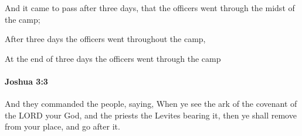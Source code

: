 			\begin{versebox}
					\item[BHS] 
					\item[ASV] And it came to pass after three days, that the officers went through the midst of the camp;
					\item[NIV] After three days the officers went throughout the camp,
					\item[NRSV] At the end of three days the officers went through the camp
			\end{versebox}

		\paragraph{Joshua 3:3} %
			\label{JOSHUA-3-3}

			And they commanded the people, saying, When ye see the ark of the covenant of the LORD your God, and the priests the Levites bearing it, then ye shall remove from your place, and go after it.

